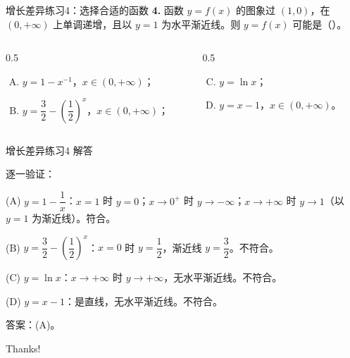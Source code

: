 \documentclass[10pt,aspectratio=169,serif]{beamer}
\begin{document}
\begin{frame}[t]{增长差异练习4：选择合适的函数}
\textbf{4.} 函数 $y = f(x)$ 的图象过 $(1, 0)$，在 $(0,+\infty)$ 上单调递增，且以 $y=1$ 为水平渐近线。则 $y = f(x)$ 可能是（\quad）。

\vspace{0.5em}
\begin{columns}[t]
\begin{column}{0.5\textwidth}
\begin{enumerate}[(A)]
  \item $y = 1 - x^{-1}$，$x\in(0,+\infty)$；
  \item $y = \dfrac{3}{2} - \left(\dfrac{1}{2}\right)^x$，$x\in(0,+\infty)$；
\end{enumerate}
\end{column}
\begin{column}{0.5\textwidth}
\begin{enumerate}[(A)]\setcounter{enumi}{2}
  \item $y = \ln x$；
  \item $y = x - 1$，$x\in(0,+\infty)$。
\end{enumerate}
\end{column}
\end{columns}
\end{frame}

\begin{frame}[t]{增长差异练习4 解答}
\begin{tcolorbox}[colback=orange!10,colframe=orange,title=\textbf{解}]
逐一验证：

\vspace{0.3em}
(A) $y=1-\dfrac{1}{x}$：$x=1$ 时 $y=0$；$x\to 0^+$ 时 $y\to -\infty$；$x\to+\infty$ 时 $y\to 1$（以 $y=1$ 为渐近线）。\alert{符合}。

(B) $y=\dfrac{3}{2}-\left(\dfrac{1}{2}\right)^x$：$x=0$ 时 $y=\dfrac{1}{2}$，渐近线 $y=\dfrac{3}{2}$。不符合。

(C) $y=\ln x$：$x\to+\infty$ 时 $y\to+\infty$，无水平渐近线。不符合。

(D) $y=x-1$：是直线，无水平渐近线。不符合。

\vspace{0.3em}
\alert{答案：(A)}。
\end{tcolorbox}
\end{frame}

\begin{frame}[c]
  \begin{center}
    {\Huge\calligra Thanks!}
  \end{center}
\end{frame}
\end{document}
